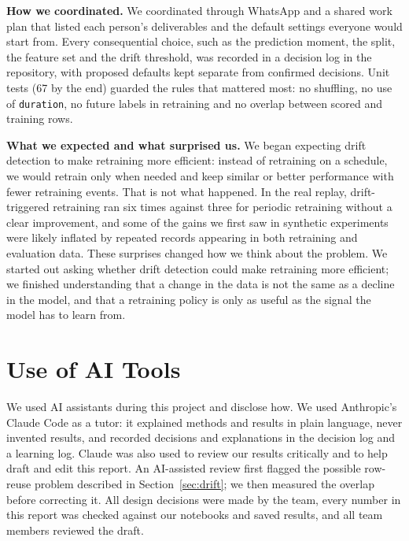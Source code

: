 \documentclass[conference]{IEEEtran}
\begin{document}
\textbf{How we coordinated.} We coordinated through WhatsApp and a shared work plan that listed each person's deliverables and the default settings everyone would start from. Every consequential choice, such as the prediction moment, the split, the feature set and the drift threshold, was recorded in a decision log in the repository, with proposed defaults kept separate from confirmed decisions. Unit tests (67 by the end) guarded the rules that mattered most: no shuffling, no use of \texttt{duration}, no future labels in retraining and no overlap between scored and training rows.

\textbf{What we expected and what surprised us.} We began expecting drift detection to make retraining more efficient: instead of retraining on a schedule, we would retrain only when needed and keep similar or better performance with fewer retraining events. That is not what happened. In the real replay, drift-triggered retraining ran six times against three for periodic retraining without a clear improvement, and some of the gains we first saw in synthetic experiments were likely inflated by repeated records appearing in both retraining and evaluation data. These surprises changed how we think about the problem. We started out asking whether drift detection could make retraining more efficient; we finished understanding that a change in the data is not the same as a decline in the model, and that a retraining policy is only as useful as the signal the model has to learn from.

\section{Use of AI Tools}
\label{sec:ai}

We used AI assistants during this project and disclose how. We used Anthropic's Claude Code as a tutor: it explained methods and results in plain language, never invented results, and recorded decisions and explanations in the decision log and a learning log. Claude was also used to review our results critically and to help draft and edit this report.
An AI-assisted review first flagged the possible row-reuse problem described in Section~\ref{sec:drift}; we then measured the overlap before correcting it. All design decisions were made by the team, every number in this report was checked against our notebooks and saved results, and all team members reviewed the draft.
\end{document}
